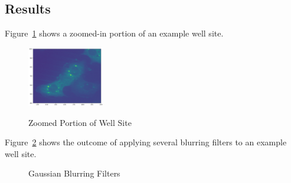 \documentclass[11pt]{article}
\begin{document}
\subsection{Results}

Figure~\ref{fig:zoomed} shows a zoomed-in portion of an example well site.

\begin{figure}[H]
    \centering
    {
        {
            \includegraphics[width=0.3\textwidth]{zoomed.png}
        }  
    }\caption{Zoomed Portion of Well Site}
    \label{fig:zoomed}
\end{figure}

Figure~\ref{fig:gaussian_blurring} shows the outcome of applying several blurring filters to an 
example well site.

\begin{figure}[H]
    \centering
    {
        {
        }\hfill{
        }
    }\caption{Gaussian Blurring Filters}
    \label{fig:gaussian_blurring}
\end{figure}
\end{document}
